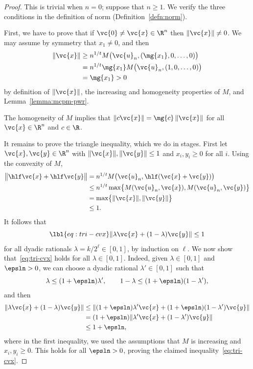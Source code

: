 \begin{proof}
This is trivial when $n = 0$; suppose that $n \geq 1$.  We verify the three
conditions in the definition of norm (Definition~\ref{defn:norm}).

First, we have to prove that if $\vc{0} \neq \vc{x} \in \R^n$ then
$\|\vc{x}\| \neq 0$.  We may assume by symmetry that $x_1 \neq 0$, and then
% 
\begin{align*}
\|\vc{x}\|      &
\geq
n^{1/t} M\bigl(\vc{u}_n, (\mg{x_1}, 0, \ldots, 0) \bigr)   \\
&
=
n^{1/t} \mg{x_1} M\bigl(\vc{u}_n, (1, 0, \ldots, 0)\bigr)  \\
&
=
\mg{x_1} > 0
\end{align*}
% 
by definition of $\|\vc{x}\|$, the increasing and homogeneity properties of
$M$, and 
Lemma~\ref{lemma:mcpm-pwr}. 

The homogeneity of $M$ implies that $\|c\vc{x}\| = \mg{c}\,\|\vc{x}\|$ for
all $\vc{x} \in \R^n$ and $c \in \R$.

It remains to prove the triangle inequality, which we do in stages.  First
let $\vc{x}, \vc{y} \in \R^n$ with $\|\vc{x}\|, \|\vc{y}\| \leq 1$ and
$x_i, y_i \geq 0$ for all $i$.  Using the convexity of $M$,
% 
\begin{align*}
\bigl\| \hlf \vc{x} + \hlf \vc{y} \bigr\|       &
=
n^{1/t} M\bigl( \vc{u}_n, \hlf(\vc{x} + \vc{y}) \bigr)  \\
&
\leq
n^{1/t} \max\bigl\{ M(\vc{u}_n, \vc{x}), M(\vc{u}_n, \vc{y}) \bigr\}    \\
&
=
\max \bigl\{ \|\vc{x}\|, \|\vc{y}\| \bigr\}    \\
&
\leq
1.
\end{align*}
% 
It follows that
% 
\begin{equation}
\lbl{eq:tri-cvx}
\|\lambda \vc{x} + (1 - \lambda) \vc{y}\| \leq 1
\end{equation}
% 
for all dyadic rationals $\lambda = k/2^\ell \in [0, 1]$, by induction on
$\ell$.  We now show that~\eqref{eq:tri-cvx} holds for all $\lambda \in [0,
  1]$.  Indeed, given $\lambda \in [0, 1]$ and $\epsln > 0$, we can choose
a dyadic rational $\lambda' \in [0, 1]$ such that
\[
\lambda \leq (1 + \epsln) \lambda',
\qquad
1 - \lambda \leq (1 + \epsln)(1 - \lambda'),
\]
and then
% 
\begin{align*}
\| \lambda \vc{x} + (1 - \lambda) \vc{y} \|   &
\leq
\| 
(1 + \epsln) \lambda' \vc{x} + (1 + \epsln)(1 - \lambda') \vc{y} 
\| \\
&
=
(1 + \epsln) \| \lambda' \vc{x} + (1 - \lambda') \vc{y} \|    \\
&
\leq
1 + \epsln,
\end{align*}
% 
where in the first inequality, we used the assumptions that $M$ is
increasing and $x_i, y_i \geq 0$.  This holds for all $\epsln > 0$, proving
the claimed inequality~\eqref{eq:tri-cvx}.


\end{proof}
